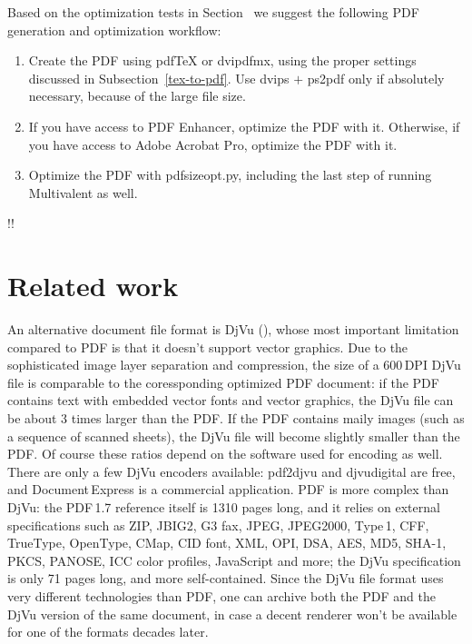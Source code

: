 \documentclass{ltugproc}
\def\cmd{\textsf}
\begin{document}
Based on the optimization tests in Section~\label{tools} we suggest the
following PDF generation and optimization workflow:

\begin{enumerate}

\item Create the PDF using pdf\TeX{} or \cmd{dvipdfmx}, using the proper
settings discussed in Subsection~\ref{tex-to-pdf}. Use \cmd{dvips} $+$
\cmd{ps2pdf} only if absolutely necessary, because of the large file size.

\item If you have access to PDF Enhancer, optimize the PDF with it. Otherwise,
if you have access to Adobe Acrobat Pro, optimize the PDF with it.

\item Optimize the PDF with \cmd{pdfsizeopt.py}, including the last step of
running Multivalent as well.

\end{enumerate}

!!


\section{Related work}\label{related-work}

An alternative document file format is DjVu (\cite{djvu,djvu-tutorial}),
whose most important limitation compared to PDF is that it doesn't support
vector graphics. Due to the sophisticated image layer separation and
compression, the size of a 600\,DPI DjVu file is comparable to the
coressponding optimized PDF document:
if the PDF contains text with embedded vector fonts and
vector graphics, the DjVu file can be about 3 times larger than the PDF.
If the PDF contains maily images (such
as a sequence of scanned sheets), the DjVu file will become slightly smaller
than the PDF. 
Of course these ratios depend on the software used for encoding as well.
There are only a few DjVu encoders available: \cmd{pdf2djvu} and
\cmd{djvudigital} are free, and Document\,Express is a commercial
application. PDF is more complex than DjVu: the PDF\,1.7 reference itself is
1310 pages long, and it relies on external specifications such as ZIP,
JBIG2, G3 fax, JPEG, JPEG2000, Type\,1, CFF, TrueType, OpenType, CMap,
CID font, XML, OPI, DSA, AES, MD5, SHA-1, PKCS, PANOSE, ICC color profiles,
JavaScript and more; the DjVu specification \cite{djvu3spec} is only 71
pages long, and more self-contained.
Since the DjVu file format uses very different technologies than PDF, one
can archive both the PDF and the DjVu version of the same document, in case
a decent renderer won't be available for one of the formats decades later.
\end{document}
